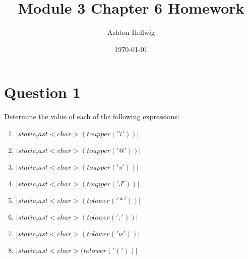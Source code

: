 \documentclass[a4paper, 11pt]{article}
\title{Module 3 Chapter 6 Homework}
\author{Ashton Hellwig}
\date\today
\begin{document}
  \maketitle
  \tableofcontents
  \lstlistoflistings
  \newpage

  \section{Question 1}
    Determine the value of each of the following expressions:
    \begin{enumerate}[label=\Alph*.]
      \item $|static_cast<char>(toupper('7'))|$
      \item $|static_cast<char> (toupper('@'))|$
      \item $|static_cast<char> (toupper('s'))|$
      \item $|static_cast<char> (toupper('J'))|$
      \item $|static_cast<char> (tolower('*'))|$
      \item $|static_cast<char> (tolower(';'))|$
      \item $|static_cast<char> (tolower('w'))|$
      \item $|static_cast<char> (tolower('('))|$
    \end{enumerate}

\end{document}
